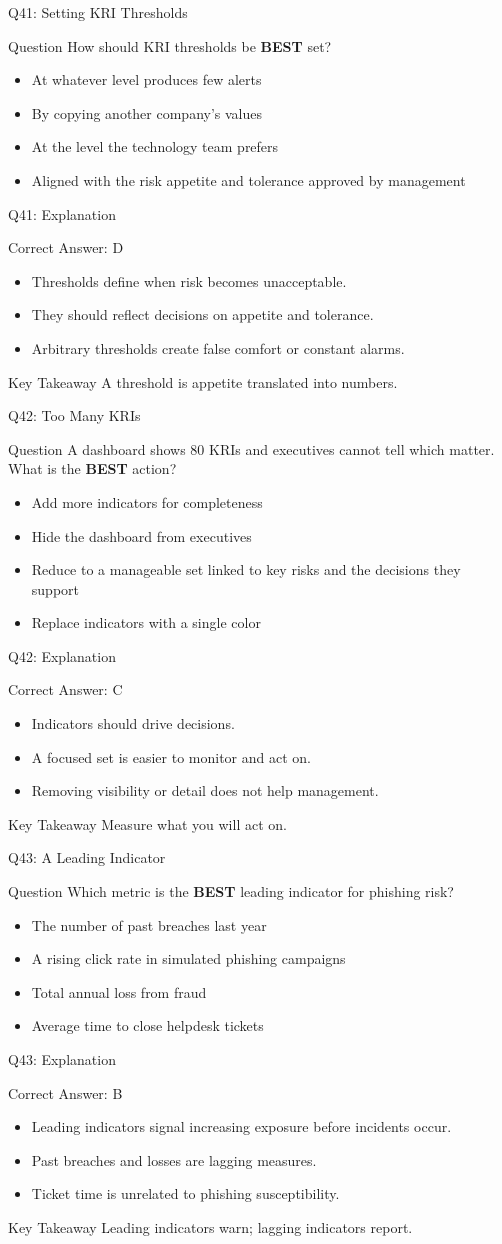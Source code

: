 \documentclass[aspectratio=169]{beamer}
\newcommand{\hq}[7]{%
	\begin{frame}{Q#1: #2}
		\begin{block}{Question}
			#3
		\end{block}
		\begin{itemize}
			#4
		\end{itemize}
	\end{frame}
	\begin{frame}{Q#1: Explanation}
		\begin{block}{Correct Answer: #5}
			\begin{itemize}
				#6
			\end{itemize}
		\end{block}
		\begin{alertblock}{Key Takeaway}
			#7
		\end{alertblock}
	\end{frame}
}
\begin{document}
	\hq{41}{Setting KRI Thresholds}
	{How should KRI thresholds be \textbf{BEST} set?}
	{\item[\textbf{(A)}] At whatever level produces few alerts
		\item[\textbf{(B)}] By copying another company's values
		\item[\textbf{(C)}] At the level the technology team prefers
		\item[\textbf{(D)}] Aligned with the risk appetite and tolerance approved by management}
	{D}
	{\item Thresholds define when risk becomes unacceptable.
		\item They should reflect decisions on appetite and tolerance.
		\item Arbitrary thresholds create false comfort or constant alarms.}
	{A threshold is appetite translated into numbers.}
	
	\hq{42}{Too Many KRIs}
	{A dashboard shows 80 KRIs and executives cannot tell which matter. What is the \textbf{BEST} action?}
	{\item[\textbf{(A)}] Add more indicators for completeness
		\item[\textbf{(B)}] Hide the dashboard from executives
		\item[\textbf{(C)}] Reduce to a manageable set linked to key risks and the decisions they support
		\item[\textbf{(D)}] Replace indicators with a single color}
	{C}
	{\item Indicators should drive decisions.
		\item A focused set is easier to monitor and act on.
		\item Removing visibility or detail does not help management.}
	{Measure what you will act on.}
	
	\hq{43}{A Leading Indicator}
	{Which metric is the \textbf{BEST} leading indicator for phishing risk?}
	{\item[\textbf{(A)}] The number of past breaches last year
		\item[\textbf{(B)}] A rising click rate in simulated phishing campaigns
		\item[\textbf{(C)}] Total annual loss from fraud
		\item[\textbf{(D)}] Average time to close helpdesk tickets}
	{B}
	{\item Leading indicators signal increasing exposure before incidents occur.
		\item Past breaches and losses are lagging measures.
		\item Ticket time is unrelated to phishing susceptibility.}
	{Leading indicators warn; lagging indicators report.}
	
\end{document}
